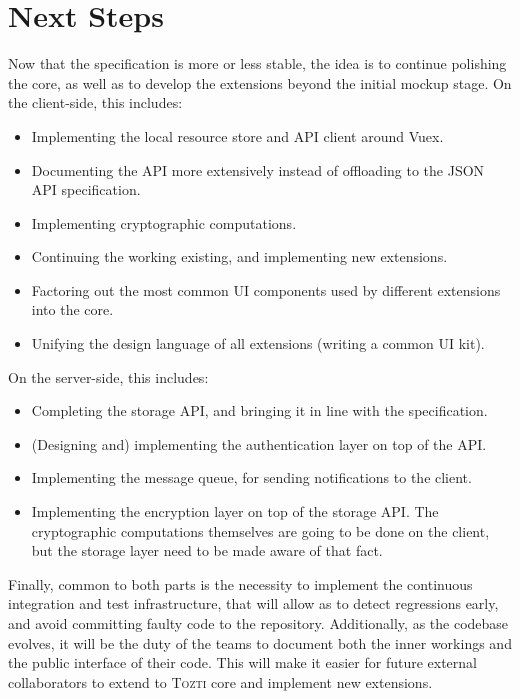 \documentclass[a4paper, english]{report}
\newcommand{\tozti}{\textsc{Tozti}\xspace}
\begin{document}
\section{Next Steps}
Now that the specification is more or less stable, the idea is to continue polishing the core, as well as to develop the extensions beyond the initial mockup stage. 
On the client-side, this includes:
\begin{itemize}
  \item Implementing the local resource store and API client around Vuex.
  \item Documenting the API more extensively instead of offloading to the JSON API specification.
  \item Implementing cryptographic computations.
  \item Continuing the working existing, and implementing new extensions.
  \item Factoring out the most common UI components used by different extensions into the core.
  \item Unifying the design language of all extensions (writing a common UI kit).
\end{itemize}
On the server-side, this includes:
\begin{itemize}
  \item Completing the storage API, and bringing it in line with the specification.
  \item (Designing and) implementing the authentication layer on top of the API.
  \item Implementing the message queue, for sending notifications to the client.
  \item Implementing the encryption layer on top of the storage API. The cryptographic computations themselves are going to be done on the client, but the storage layer need to be made aware of that fact.
\end{itemize}

Finally, common to both parts is the necessity to implement the continuous integration and test infrastructure, that will allow as to detect regressions early, and avoid committing faulty code to the repository. Additionally, as the codebase evolves, it will be the duty of the teams to document both the inner workings and the public interface of their code. This will make it easier for future external collaborators to extend to \tozti core and implement new extensions.
\end{document}
